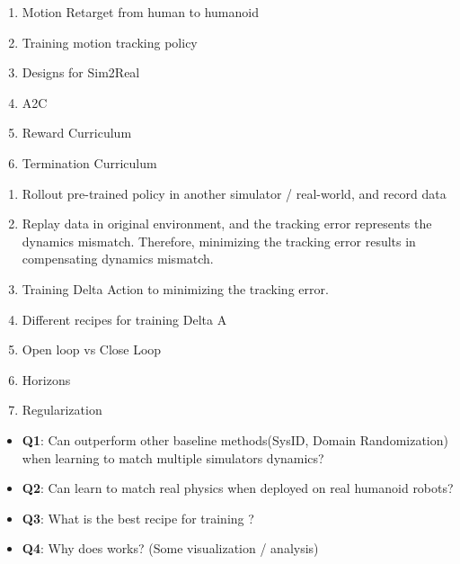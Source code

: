 
\begin{enumerate}
    \item Motion Retarget from human to humanoid
    \item Training motion tracking policy
    \item Designs for Sim2Real
        \item A2C
        \item Reward Curriculum
        \item Termination Curriculum
\end{enumerate}


\begin{enumerate}
    \item Rollout pre-trained policy in another simulator / real-world, and record data
    \item Replay data in original environment, and the tracking error represents the dynamics mismatch. Therefore, minimizing the tracking error results in compensating dynamics mismatch.
    \item Training Delta Action to minimizing the tracking error.
    \item Different recipes for training Delta A
        \item Open loop vs Close Loop
        \item Horizons
        \item Regularization
\end{enumerate}


\begin{itemize}
    \item \textbf{Q1}: Can \method outperform other baseline methods(SysID, Domain Randomization) when learning to match multiple simulators dynamics? 
    \item \textbf{Q2}: Can \method learn to match real physics when deployed on real humanoid robots?
    \item \textbf{Q3}: What is the best recipe for training \method?
    \item \textbf{Q4}: Why does \method works? (Some visualization / analysis)
\end{itemize}